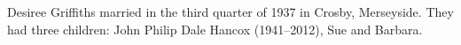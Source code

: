 
Desiree Griffiths married  in the third quarter of 1937 in Crosby, Merseyside. \cite{NMHancoxMarriage}   They had three children: John Philip Dale Hancox (1941--2012), Sue and Barbara.



